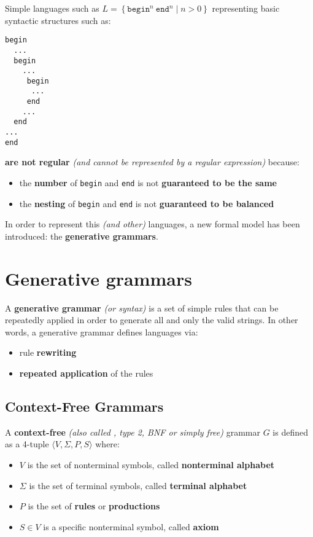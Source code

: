 \documentclass[english]{article}
\begin{document}
Simple languages such as \(L = \left\{ \texttt{begin}^n \ \texttt{end}^n \mid n > 0 \right\}\) representing basic syntactic structures such as:

\begin{verbatim}
begin
  ...
  begin
    ...
     begin
      ...
     end
    ...
  end
...
end
\end{verbatim}

\textbf{are not regular} \textit{(and cannot be represented by a regular expression)} because:

\begin{itemize}
  \item the \textbf{number} of \texttt{begin} and \texttt{end} is not \textbf{guaranteed to be the same}
  \item the \textbf{nesting} of \texttt{begin} and \texttt{end} is not \textbf{guaranteed to be balanced}
\end{itemize}

\bigskip
In order to represent this \textit{(and other)} languages, a new formal model has been introduced: the \textbf{generative grammars}.

\clearpage

\section{Generative grammars}

A \textbf{generative grammar} \textit{(or syntax)} is a set of simple rules that can be repeatedly applied in order to generate all and only the valid strings.
In other words, a generative grammar defines languages via:

\begin{itemize}
  \item rule \textbf{rewriting}
  \item \textbf{repeated application} of the rules
\end{itemize}

\subsection{Context-Free Grammars}

A \textbf{context-free} \textit{(also called \CF, type 2, BNF or simply free)} grammar \(G\) is defined as a 4-tuple \(\langle V, \Sigma, P, S\rangle\) where:

\begin{itemize}
  \item \(V\) is the set of nonterminal symbols, called \textbf{nonterminal alphabet}
  \item \(\Sigma\) is the set of terminal symbols, called \textbf{terminal alphabet}
  \item \(P\) is the set of \textbf{rules} or \textbf{productions}
  \item \(S \in V\) is a specific nonterminal symbol, called \textbf{axiom}
\end{itemize}
\end{document}
